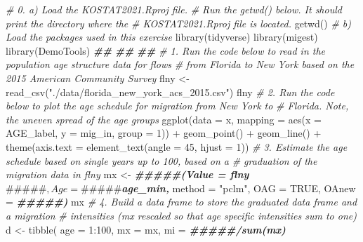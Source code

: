 \documentclass[
]{book}
\newenvironment{Shaded}{\begin{snugshade}}{\end{snugshade}}
\newcommand{\AttributeTok}[1]{\textcolor[rgb]{0.77,0.63,0.00}{#1}}
\newcommand{\CommentTok}[1]{\textcolor[rgb]{0.56,0.35,0.01}{\textit{#1}}}
\newcommand{\ConstantTok}[1]{\textcolor[rgb]{0.00,0.00,0.00}{#1}}
\newcommand{\DecValTok}[1]{\textcolor[rgb]{0.00,0.00,0.81}{#1}}
\newcommand{\DocumentationTok}[1]{\textcolor[rgb]{0.56,0.35,0.01}{\textbf{\textit{#1}}}}
\newcommand{\FunctionTok}[1]{\textcolor[rgb]{0.00,0.00,0.00}{#1}}
\newcommand{\NormalTok}[1]{#1}
\newcommand{\OtherTok}[1]{\textcolor[rgb]{0.56,0.35,0.01}{#1}}
\newcommand{\SpecialCharTok}[1]{\textcolor[rgb]{0.00,0.00,0.00}{#1}}
\newcommand{\StringTok}[1]{\textcolor[rgb]{0.31,0.60,0.02}{#1}}
\begin{document}
\begin{Shaded}
\begin{Highlighting}[]
\CommentTok{\# 0.  a) Load the KOSTAT2021.Rproj file. }
\CommentTok{\#     Run the getwd() below. It should print the directory where the }
\CommentTok{\#     KOSTAT2021.Rproj file is located.}
\FunctionTok{getwd}\NormalTok{()}
\CommentTok{\#     b) Load the packages used in this exercise}
\FunctionTok{library}\NormalTok{(tidyverse)}
\FunctionTok{library}\NormalTok{(migest)}
\FunctionTok{library}\NormalTok{(DemoTools)}
\DocumentationTok{\#\#}
\DocumentationTok{\#\#}
\DocumentationTok{\#\#}
\CommentTok{\# 1. Run the code below to read in the population age structure data for flows}
\CommentTok{\#    from Florida to New York based on the 2015 American Community Survey}
\NormalTok{flny }\OtherTok{\textless{}{-}} \FunctionTok{read\_csv}\NormalTok{(}\StringTok{"./data/florida\_new\_york\_acs\_2015.csv"}\NormalTok{)}
\NormalTok{flny}
\CommentTok{\# 2. Run the code below to plot the age schedule for migration from New York to }
\CommentTok{\#    Florida. Note, the uneven spread of the age groups}
\FunctionTok{ggplot}\NormalTok{(}\AttributeTok{data =}\NormalTok{ x, }\AttributeTok{mapping =} \FunctionTok{aes}\NormalTok{(}\AttributeTok{x =}\NormalTok{ AGE\_label, }\AttributeTok{y =}\NormalTok{ mig\_in, }\AttributeTok{group =} \DecValTok{1}\NormalTok{)) }\SpecialCharTok{+}
  \FunctionTok{geom\_point}\NormalTok{() }\SpecialCharTok{+}
  \FunctionTok{geom\_line}\NormalTok{() }\SpecialCharTok{+}
  \FunctionTok{theme}\NormalTok{(}\AttributeTok{axis.text =} \FunctionTok{element\_text}\NormalTok{(}\AttributeTok{angle =} \DecValTok{45}\NormalTok{, }\AttributeTok{hjust =} \DecValTok{1}\NormalTok{))}
\CommentTok{\# 3. Estimate the age schedule based on single years up to 100, based on a }
\CommentTok{\#    graduation of the migration data in flny}
\NormalTok{mx }\OtherTok{\textless{}{-}} \DocumentationTok{\#\#\#\#\#(Value = flny$\#\#\#\#\#, Age = \#\#\#\#\#$age\_min, }
\NormalTok{               method }\OtherTok{=} \StringTok{"pclm"}\NormalTok{, OAG }\OtherTok{=}  \ConstantTok{TRUE}\NormalTok{, OAnew }\OtherTok{=} \DocumentationTok{\#\#\#\#\#)}
\NormalTok{mx}
\CommentTok{\# 4. Build a data frame to store the graduated data frame and a migration }
\CommentTok{\#    intensities (mx rescaled so that age specific intensities sum to one)}
\NormalTok{d }\OtherTok{\textless{}{-}} \FunctionTok{tibble}\NormalTok{(}
  \AttributeTok{age =} \DecValTok{1}\SpecialCharTok{:}\DecValTok{100}\NormalTok{, }
  \AttributeTok{mx =}\NormalTok{ mx,}
  \AttributeTok{mi =} \DocumentationTok{\#\#\#\#\#/sum(mx)}

\end{Highlighting}
\end{Shaded}
\end{document}
